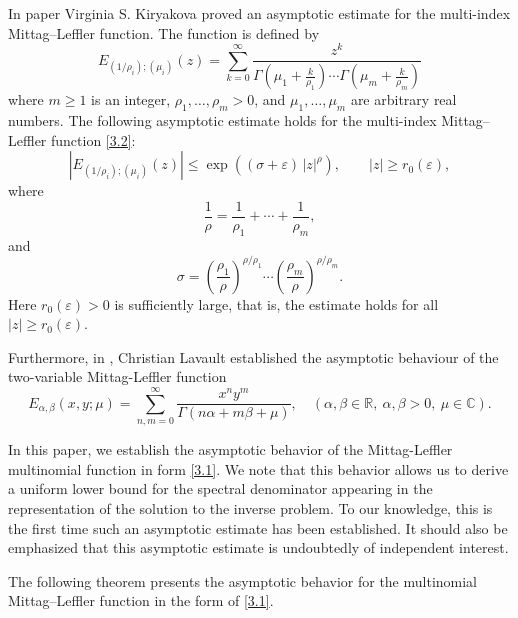 \documentclass[12pt, reqno]{amsart}
\theoremstyle{definition}
\theoremstyle{remark}
\numberwithin{equation}{section}
\begin{document}
 In paper \cite{24} Virginia S. Kiryakova proved an asymptotic estimate for the multi-index Mittag--Leffler function. 
The function is defined by
\begin{equation}\label{3.2}
E_{(1/\rho_i);(\mu_i)}(z)
=\sum_{k=0}^{\infty}
\frac{z^k}
{\Gamma\!\left(\mu_1 + \frac{k}{\rho_1}\right)
 \cdots
 \Gamma\!\left(\mu_m + \frac{k}{\rho_m}\right)}
\end{equation}
where $m \ge 1$ is an integer, $\rho_1, \ldots, \rho_m > 0$, and 
$\mu_1, \ldots, \mu_m$ are arbitrary real numbers.
The following asymptotic estimate holds for the multi-index Mittag--Leffler function \eqref{3.2}:
\[
\left| E_{(1/\rho_i);(\mu_i)}(z) \right|
\le
\exp\!\left( (\sigma + \varepsilon)\, |z|^{\rho} \right),
\qquad |z| \ge r_0(\varepsilon),
\]
where
\[
\frac{1}{\rho}
=
\frac{1}{\rho_1}
+\cdots+
\frac{1}{\rho_m},
\]
and
\[
\sigma
=
\left( \frac{\rho_1}{\rho} \right)^{\rho/\rho_1}
\cdots
\left( \frac{\rho_m}{\rho} \right)^{\rho/\rho_m}.
\]
Here $r_0(\varepsilon) > 0$ is sufficiently large, that is, 
the estimate holds for all $|z| \ge r_0(\varepsilon)$.

Furthermore, in \cite{25}, Christian Lavault established the asymptotic behaviour of the two-variable Mittag-Leffler function
$$
E_{\alpha,\beta}(x, y; \mu) = 
\sum_{n,m=0}^{\infty} \frac{x^n y^m}{\Gamma(n\alpha + m\beta + \mu)}, 
\quad (\alpha, \beta \in \mathbb{R}, \ \alpha, \beta > 0, \ \mu \in \mathbb{C}).
$$

In this paper, we establish the asymptotic behavior of the Mittag-Leffler multinomial
function in form \eqref{3.1}. We note that this behavior allows us to derive a uniform
lower bound for the spectral denominator appearing in the representation of the solution to the inverse problem. To our knowledge, this is the first time such an asymptotic estimate has been established. It should also be emphasized that this asymptotic estimate
is undoubtedly of independent interest.

The following theorem presents the asymptotic behavior for the multinomial Mittag–Leffler function in the form of \eqref{3.1}.
\end{document}
